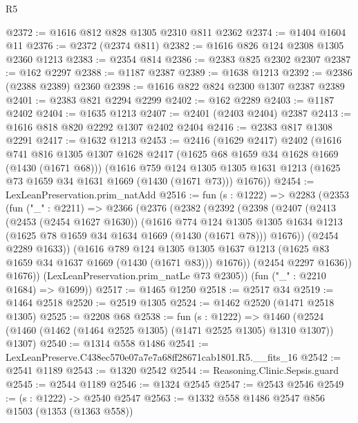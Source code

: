 \begin{lexlean}{R5}
\begin{coremodule}
@2372 := @1616 @812 @828 @1305 @2310 @811 @2362
@2374 := @1404 @1604 @11
@2376 := @2372 (@2374 @811)
@2382 := @1616 @826 @124 @2308 @1305 @2360 @1213
@2383 := @2354 @814
@2386 := @2383 @825 @2302 @2307
@2387 := @162 @2297
@2388 := @1187 @2387
@2389 := @1638 @1213
@2392 := @2386 (@2388 @2389) @2360
@2398 := @1616 @822 @824 @2300 @1307 @2387 @2389
@2401 := @2383 @821 @2294 @2299
@2402 := @162 @2289
@2403 := @1187 @2402
@2404 := @1635 @1213
@2407 := @2401 (@2403 @2404) @2387
@2413 := @1616 @818 @820 @2292 @1307 @2402 @2404
@2416 := @2383 @817 @1308 @2291
@2417 := @1632 @1213
@2453 := @2416
    (@1629 @2417)
    @2402
    (@1616
      @741
      @816
      @1305
      @1307
      @1628
      @2417
      (@1625 @68 @1659 @34 @1628 @1669 (@1430 (@1671 @68)))
      (@1616
        @759
        @124
        @1305
        @1305
        @1631
        @1213
        (@1625 @73 @1659 @34 @1631 @1669 (@1430 (@1671 @73)))
        @1676))
@2454 := LexLeanPreservation.prim_natAdd
@2516 := fun (s : @1222) =>
  @2283
    (@2353
      (fun ("_" : @2211) =>
      @2366
        (@2376
          (@2382
            (@2392
              (@2398
                (@2407
                  (@2413
                    (@2453 (@2454 @1627 @1630))
                    (@1616
                      @774
                      @124
                      @1305
                      @1305
                      @1634
                      @1213
                      (@1625 @78 @1659 @34 @1634 @1669 (@1430 (@1671 @78)))
                      @1676))
                  (@2454 @2289 @1633))
                (@1616
                  @789
                  @124
                  @1305
                  @1305
                  @1637
                  @1213
                  (@1625 @83 @1659 @34 @1637 @1669 (@1430 (@1671 @83)))
                  @1676))
              (@2454 @2297 @1636))
            @1676))
        (LexLeanPreservation.prim_natLe @73 @2305))
      (fun ("_" : @2210 @1684) => @1699))
@2517 := @1465 @1250
@2518 := @2517 @34
@2519 := @1464 @2518
@2520 := @2519 @1305
@2524 := @1462 @2520 (@1471 @2518 @1305)
@2525 := @2208 @68
@2538 := fun (s : @1222) =>
  @1460 (@2524 (@1460 (@1462 (@1464 @2525 @1305) (@1471 @2525 @1305) @1310 @1307)) @1307)
@2540 := @1314 @558 @1486
@2541 := LexLeanPreserve.C438ec570e07a7e7a68ff28671cab1801.R5.__fits_16
@2542 := @2541 @1189
@2543 := @1320 @2542
@2544 := Reasoning.Clinic.Sepsis.guard
@2545 := @2544 @1189
@2546 := @1324 @2545
@2547 := @2543 @2546
@2549 := (s : @1222) -> @2540 @2547
@2563 := @1332
    @558
    @1486
    @2547
    @856
    @1503
    (@1353 (@1363 @558))

\end{coremodule}
\end{lexlean}
